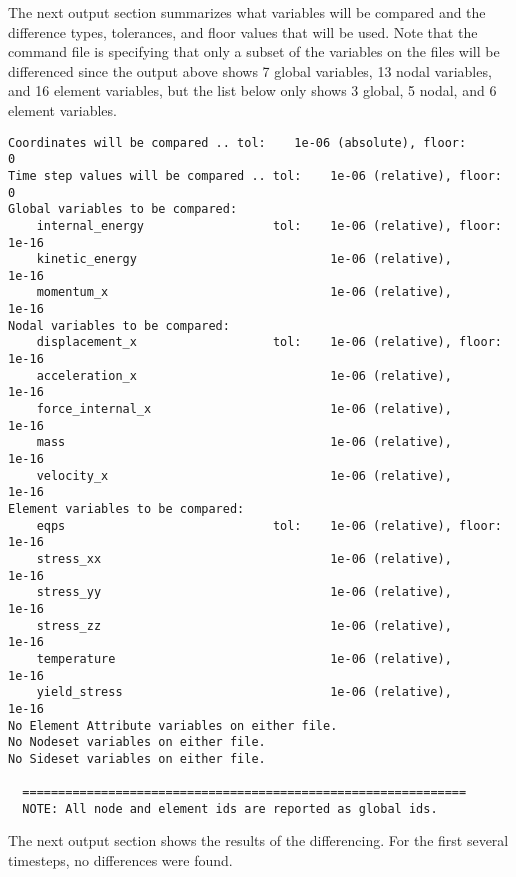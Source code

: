 \sectionline
The next output section summarizes what variables will be compared and
the difference types, tolerances, and floor values that will be used.
Note that the command file is specifying that only a subset of the
variables on the files will be differenced since the output above
shows 7 global variables, 13 nodal variables, and 16 element variables,
but the list below only shows 3 global, 5 nodal, and 6 element variables.

\begin{verbatim}
Coordinates will be compared .. tol:    1e-06 (absolute), floor:        0
Time step values will be compared .. tol:    1e-06 (relative), floor:        0
Global variables to be compared:
	internal_energy                  tol:    1e-06 (relative), floor:    1e-16
	kinetic_energy                           1e-06 (relative),           1e-16
	momentum_x                               1e-06 (relative),           1e-16
Nodal variables to be compared:
	displacement_x                   tol:    1e-06 (relative), floor:    1e-16
	acceleration_x                           1e-06 (relative),           1e-16
	force_internal_x                         1e-06 (relative),           1e-16
	mass                                     1e-06 (relative),           1e-16
	velocity_x                               1e-06 (relative),           1e-16
Element variables to be compared:
	eqps                             tol:    1e-06 (relative), floor:    1e-16
	stress_xx                                1e-06 (relative),           1e-16
	stress_yy                                1e-06 (relative),           1e-16
	stress_zz                                1e-06 (relative),           1e-16
	temperature                              1e-06 (relative),           1e-16
	yield_stress                             1e-06 (relative),           1e-16
No Element Attribute variables on either file.
No Nodeset variables on either file.
No Sideset variables on either file.

  ==============================================================
  NOTE: All node and element ids are reported as global ids.
\end{verbatim}

\sectionline
The next output section shows the results of the differencing.  For
the first several timesteps, no differences were found.

